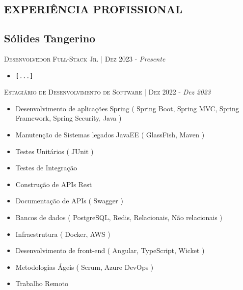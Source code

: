 
\begin{framed}
  \section{EXPERIÊNCIA PROFISSIONAL}

  \subsection{  Sólides Tangerino}

  \textsc{Desenvolvedor Full-Stack Jr.} | \textsc{Dez 2023} - \emph{Presente}
  \begin{itemize}[leftmargin=*]
    \item \verb|[...]|
  \end{itemize}

  \textsc{Estagiário de Desenvolvimento de Software} | \textsc{Dez 2022} - \emph{Dez 2023}
  \begin{itemize}[leftmargin=*]
    \item Desenvolvimento de aplicações Spring ( Spring Boot, Spring MVC, Spring Framework, Spring Security, Java )
    \item Manutenção de Sistemas legados JavaEE ( GlassFish, Maven )
    \item Testes Unitários ( JUnit )
    \item Testes de Integração
    \item Construção de APIs Rest
    \item Documentação de APIs ( Swagger )
    \item Bancos de dados ( PostgreSQL, Redis, Relacionais, Não relacionais )
    \item Infraestrutura ( Docker, AWS )
    \item Desenvolvimento de front-end ( Angular, TypeScript, Wicket )
    \item Metodologias Ágeis ( Scrum, Azure DevOps )
    \item Trabalho Remoto
  \end{itemize}


\end{framed}